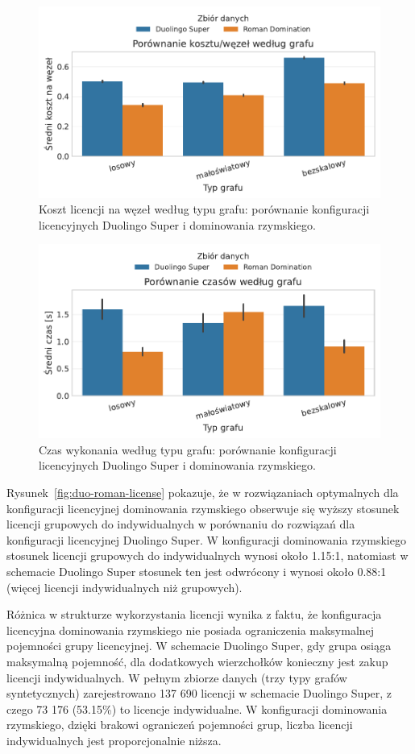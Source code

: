 \begin{figure}[H]
  \centering
  \includegraphics[width=0.6\linewidth]{assets/figures/benchmark/real/duo_vs_roman_cost_per_node_by_graph.pdf}
  \caption{Koszt licencji na węzeł według typu grafu: porównanie konfiguracji licencyjnych Duolingo Super i dominowania rzymskiego.}
  \label{fig:duo-roman-cost}
\end{figure}

\begin{figure}[H]
  \centering
  \includegraphics[width=0.6\linewidth]{assets/figures/benchmark/real/duo_vs_roman_time_by_graph.pdf}
  \caption{Czas wykonania według typu grafu: porównanie konfiguracji licencyjnych Duolingo Super i dominowania rzymskiego.}
  \label{fig:duo-roman-time}
\end{figure}

Rysunek~\ref{fig:duo-roman-license} pokazuje, że w rozwiązaniach optymalnych dla konfiguracji licencyjnej dominowania rzymskiego obserwuje się wyższy stosunek licencji grupowych do indywidualnych w porównaniu do rozwiązań dla konfiguracji licencyjnej Duolingo Super. W konfiguracji dominowania rzymskiego stosunek licencji grupowych do indywidualnych wynosi około 1.15:1, natomiast w schemacie Duolingo Super stosunek ten jest odwrócony i wynosi około 0.88:1 (więcej licencji indywidualnych niż grupowych).

Różnica w strukturze wykorzystania licencji wynika z faktu, że konfiguracja licencyjna dominowania rzymskiego nie posiada ograniczenia maksymalnej pojemności grupy licencyjnej. W schemacie Duolingo Super, gdy grupa osiąga maksymalną pojemność, dla dodatkowych wierzchołków konieczny jest zakup licencji indywidualnych. W pełnym zbiorze danych (trzy typy grafów syntetycznych) zarejestrowano 137 690 licencji w schemacie Duolingo Super, z czego 73 176 (53.15\%) to licencje indywidualne. W konfiguracji dominowania rzymskiego, dzięki brakowi ograniczeń pojemności grup, liczba licencji indywidualnych jest proporcjonalnie niższa.


